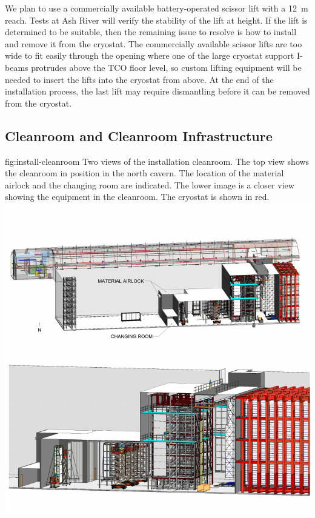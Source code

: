 We plan to use a commercially available battery-operated scissor lift with a \SI{12}{m} reach. Tests at Ash River will verify the stability of the lift at height. If the lift is determined to be suitable, then the remaining issue to resolve is how to install and remove it from the cryostat. 
The commercially available scissor lifts are too wide to fit easily through the  opening where one of the large cryostat support I-beams protrudes above the TCO floor level,  so 
custom lifting equipment will be needed to insert the lifts into the cryostat from above. 
At the end of the installation process, the last lift may require dismantling before it can be removed from the cryostat.


\subsection{Cleanroom and Cleanroom Infrastructure}
\label{sec:fdsp-tc-infr-comm}

\begin{dunefigure}{fig:install-cleanroom}
  {Two views of the installation cleanroom.  The top view shows the cleanroom in position in the north cavern. The location of the material airlock and the changing room are indicated. The lower image is a closer view showing the equipment in the cleanroom. The cryostat is shown in red.
  } 
\includegraphics[width=1.0\textwidth]{graphics/install-cleanroom.pdf}
\end{dunefigure}


